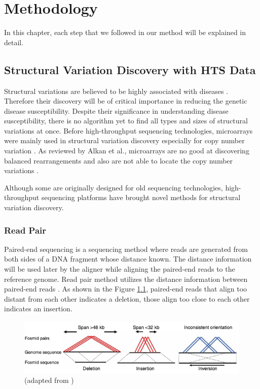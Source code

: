 \chapter{Methodology}
In this chapter, each step that we followed in our method will be explained in detail.
\section{Structural Variation Discovery with HTS Data}
Structural variations are believed to be highly associated with diseases \cite{fanciulli2007fcgr3b,fellermann2006chromosome,aitman2006copy,gonzalez2005influence}. Therefore their discovery will be of critical importance in reducing the genetic disease susceptibility. Despite their significance in understanding disease susceptibility, there is no algorithm yet to find all types and sizes of structural variations at once. Before high-throughput sequencing technologies, microarrays were mainly used in structural variation discovery especially for copy number variation \cite{alkan2011genome}. As reviewed by Alkan et al., microarrays are no good at discovering balanced rearrangements and also are not able to locate the copy number variations \cite{alkan2011genome}. 

Although some are originally designed for old sequencing technologies, high-throughput sequencing platforms have brought novel methods for structural variation discovery. 
\subsection{Read Pair}
Paired-end sequencing is a sequencing method where reads are generated from both sides of a DNA fragment whose distance known. The distance information will be used later by the aligner while aligning the paired-end reads to the reference genome. Read pair method utilizes the distance information between paired-end reads \cite{tuzun2005fine}. As shown in the Figure \ref{readpair}, paired-end reads that align too distant from each other indicates a deletion, those align too close to each other indicates an insertion.

\begin{figure}[ht]
    \centering
    \includegraphics[scale=0.4]{images/readpair.png}
    \caption{(adapted from \cite{tuzun2005fine})}
    \label{readpair}
\end{figure}
